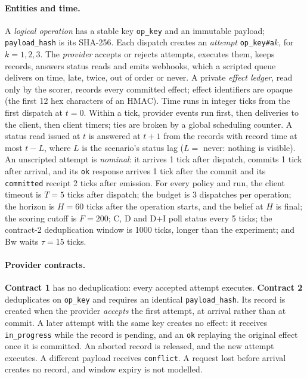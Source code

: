 \documentclass[11pt]{article}
\newcommand{\code}[1]{\texttt{#1}}
\begin{document}
\paragraph{Entities and time.} A \emph{logical operation} has a stable key \code{op\_key} and an immutable payload; \code{payload\_hash} is its SHA-256. Each dispatch creates an \emph{attempt} \code{op\_key\#a}$k$, for $k = 1, 2, 3$. The \emph{provider} accepts or rejects attempts, executes them, keeps records, answers status reads and emits webhooks, which a scripted queue delivers on time, late, twice, out of order or never. A private \emph{effect ledger}, read only by the scorer, records every committed effect; effect identifiers are opaque (the first 12 hex characters of an HMAC). Time runs in integer ticks from the first dispatch at $t=0$. Within a tick, provider events run first, then deliveries to the client, then client timers; ties are broken by a global scheduling counter. A status read issued at $t$ is answered at $t+1$ from the records with record time at most $t-L$, where $L$ is the scenario's status lag ($L=$ never: nothing is visible). An unscripted attempt is \emph{nominal}: it arrives 1 tick after dispatch, commits 1 tick after arrival, and its \code{ok} response arrives 1 tick after the commit and its \code{committed} receipt 2 ticks after emission. For every policy and run, the client timeout is $T=5$ ticks after dispatch; the budget is 3 dispatches per operation; the horizon is $H=60$ ticks after the operation starts, and the belief at $H$ is final; the scoring cutoff is $F=200$; C, D and D+I poll status every 5 ticks; the contract-2 deduplication window is 1000 ticks, longer than the experiment; and Bw waits $\tau=15$ ticks.

\paragraph{Provider contracts.} \textbf{Contract 1} has no deduplication: every accepted attempt executes. \textbf{Contract 2} deduplicates on \code{op\_key} and requires an identical \code{payload\_hash}. Its record is created when the provider \emph{accepts} the first attempt, at arrival rather than at commit. A later attempt with the same key creates no effect: it receives \code{in\_progress} while the record is pending, and an \code{ok} replaying the original effect once it is committed. An aborted record is released, and the new attempt executes. A different payload receives \code{conflict}. A request lost before arrival creates no record, and window expiry is not modelled.
\end{document}
